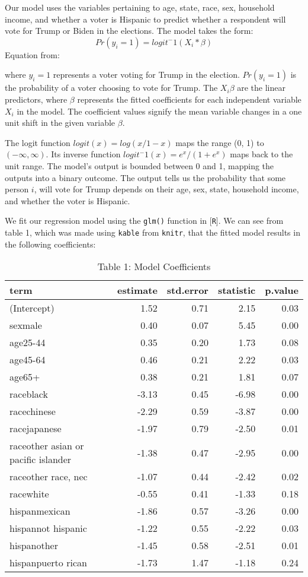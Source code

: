 \documentclass[
]{article}
\begin{document}
Our model uses the variables pertaining to age, state, race, sex, household income, and whether a voter is Hispanic to predict whether a respondent will vote for Trump or Biden in the elections.
The model takes the form:
\[ Pr(y_i = 1) = logit^-1(X_i *\beta) \]
Equation from: \cite{@RAOS}

where \(y_i = 1\) represents a voter voting for Trump in the election.
\(Pr(y_i = 1)\) is the probability of a voter choosing to vote for Trump.
The \(X_i\beta\) are the linear predictors, where \(\beta\) represents the fitted coefficients for each independent variable \(X_i\) in the model. The coefficient values signify the mean variable changes in a one unit shift in the given variable \(\beta\).

The logit function \(logit(x) = log(x/1-x)\) maps the range (0, 1) to \((-\infty, \infty)\).
Its inverse function \(logit^-1(x) = e^x/(1+e^x)\) maps back to the unit range.
The model's output is bounded between 0 and 1, mapping the outputs into a binary outcome. The output tells us the probability that some person \(i\), will vote for Trump depends on their age, sex, state, household income, and whether the voter is Hispanic.

We fit our regression model using the \texttt{glm()} function in {[}\texttt{R}{]}. We can see from table 1, which was made using \texttt{kable} from \texttt{knitr}, that the fitted model results in the following coefficients:

\begin{table}

\caption{\label{tab:unnamed-chunk-1} Table 1: Model Coefficients}
\centering
\begin{tabular}[t]{l|r|r|r|r}
\hline
term & estimate & std.error & statistic & p.value\\
\hline
(Intercept) & 1.52 & 0.71 & 2.15 & 0.03\\
\hline
sexmale & 0.40 & 0.07 & 5.45 & 0.00\\
\hline
age25-44 & 0.35 & 0.20 & 1.73 & 0.08\\
\hline
age45-64 & 0.46 & 0.21 & 2.22 & 0.03\\
\hline
age65+ & 0.38 & 0.21 & 1.81 & 0.07\\
\hline
raceblack & -3.13 & 0.45 & -6.98 & 0.00\\
\hline
racechinese & -2.29 & 0.59 & -3.87 & 0.00\\
\hline
racejapanese & -1.97 & 0.79 & -2.50 & 0.01\\
\hline
raceother asian or pacific islander & -1.38 & 0.47 & -2.95 & 0.00\\
\hline
raceother race, nec & -1.07 & 0.44 & -2.42 & 0.02\\
\hline
racewhite & -0.55 & 0.41 & -1.33 & 0.18\\
\hline
hispanmexican & -1.86 & 0.57 & -3.26 & 0.00\\
\hline
hispannot hispanic & -1.22 & 0.55 & -2.22 & 0.03\\
\hline
hispanother & -1.45 & 0.58 & -2.51 & 0.01\\
\hline
hispanpuerto rican & -1.73 & 1.47 & -1.18 & 0.24\\
\hline
\end{tabular}
\end{table}
\end{document}
